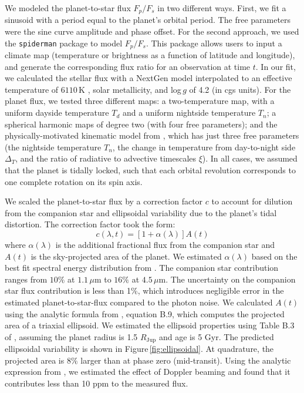 \documentclass[twocolumn, trackchanges]{aastex61}
\begin{document}
We modeled the planet-to-star flux $F_p/F_s$ in two different ways. First, we fit a sinusoid with a period equal to the planet's orbital period. The free parameters were the sine curve amplitude and phase offset. For the second approach, we used the \texttt{spiderman} package \citep{louden17} to model $F_p/F_s$. This package allows users to input a climate map (temperature or brightness as a function of latitude and longitude), and generate the corresponding flux ratio for an observation at time $t$.  In our fit, we calculated the stellar flux with a NextGen model \citep{allard12} interpolated to an effective temperature of $6110\,\mathrm{K}$ \citep{gillon14}, solar metallicity, and log\,$g$ of 4.2 (in cgs units).  For the planet flux, we tested three different maps: a two-temperature map, with a uniform dayside temperature $T_d$ and a uniform nightside temperature $T_n$; a spherical harmonic maps of degree two (with four free parameters); and the physically-motivated kinematic model from \cite{zhang17}, which has just three free parameters (the nightside temperature $T_n$, the change in temperature from day-to-night side $\Delta_T$, and the ratio of radiative to advective timescales $\xi$).  In all cases, we assumed that the planet is tidally locked, such that each orbital revolution corresponds to one complete rotation on its spin axis. 

We scaled the planet-to-star flux by a correction factor $c$ to account for dilution from the companion star and ellipsoidal variability due to the planet's tidal distortion. The correction factor took the form: 
\begin{equation}
	c(\lambda, t) = [1 + \alpha(\lambda)]A(t)
\end{equation}
where $\alpha(\lambda)$ is the additional fractional flux from the companion star and $A(t)$ is the sky-projected area of the planet. We estimated $\alpha(\lambda)$ based on the best fit spectral energy distribution from \cite{cartier17}. The companion star contribution ranges from $10\%$ at $1.1\,\mu$m to $16\%$ at $4.5\,\mu$m. The uncertainty on the companion star flux contribution  is less than 1\%, which introduces negligible error in the estimated planet-to-star-flux compared to the photon noise.   We calculated $A(t)$ using the analytic formula from \cite{leconte11b}, equation B.9, which computes the projected area of a triaxial ellipsoid. We estimated the ellipsoid properties using Table B.3 of \cite{leconte11a}, assuming the planet radius is 1.5 $R_\mathrm{Jup}$ and age is 5 Gyr. The predicted ellipsoidal variability is shown in Figure\,\ref{fig:ellipsoidal}. At quadrature, the projected area is $8\%$ larger than at phase zero (mid-transit). Using the analytic expression from \cite{loeb03}, we estimated the effect of Doppler beaming and found that it contributes less than 10 ppm to the measured flux. 
\end{document}
